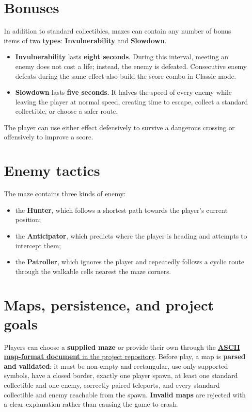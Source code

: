 \section{Bonuses}

In addition to standard collectibles, mazes can contain any number of bonus items of two \textbf{types}:
\textbf{Invulnerability} and \textbf{Slowdown}.

\begin{itemize}
  \item \textbf{Invulnerability} lasts \textbf{eight seconds}. During this interval, meeting an enemy does not
  cost a life; instead, the enemy is defeated. Consecutive enemy defeats during the same effect also build
  the score combo in Classic mode.
  \item \textbf{Slowdown} lasts \textbf{five seconds}. It halves the speed of every enemy while leaving the
  player at normal speed, creating time to escape, collect a standard collectible, or choose a safer route.
\end{itemize}

The player can use either effect defensively to survive a dangerous crossing or offensively to improve a score.

\section{Enemy tactics}

The maze contains three kinds of enemy:

\begin{itemize}
  \item the \textbf{Hunter}, which follows a shortest path towards the player's current position;
  \item the \textbf{Anticipator}, which predicts where the player is heading and attempts to intercept them;
  \item the \textbf{Patroller}, which ignores the player and repeatedly follows a cyclic route through the
  walkable cells nearest the maze corners.
\end{itemize}

\section{Maps, persistence, and project goals}

Players can choose a \textbf{supplied maze} or provide their own through the
\href{https://github.com/PPS-25/PPS-25-scala-man/blob/dev/docs/map-format.md}{\textbf{ASCII map-format document} in the project repository}.
Before play, a map is
\textbf{parsed and validated}: it must be non-empty and rectangular, use only supported symbols, have a closed border,
exactly one player spawn, at least one standard collectible and one enemy, correctly paired teleports, and every
standard collectible and enemy reachable from the spawn. \textbf{Invalid maps} are rejected with a clear explanation rather
than causing the game to crash.

